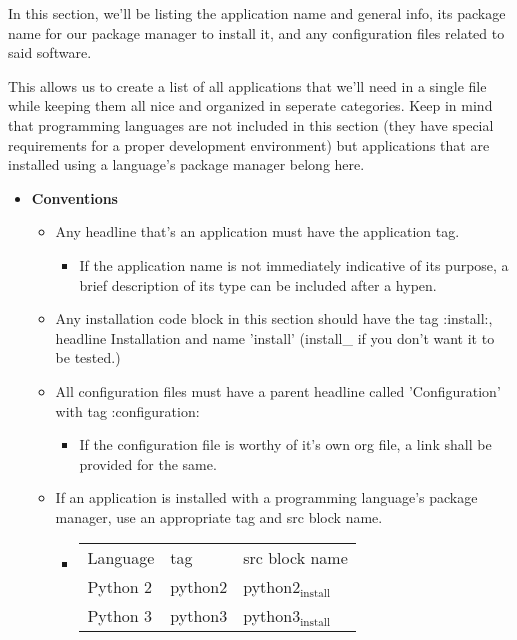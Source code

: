 \documentclass[11pt]{article}
\begin{document}
In this section, we'll be listing the application name and general info, its package name for our package manager to install it, and any configuration files related to said software.

This allows us to create a list of all applications that we'll need in a single file while keeping them all nice and organized in seperate categories. Keep in mind that programming languages are not included in this section (they have special requirements for a proper development environment) but applications that are installed using a language's package manager belong here.

\begin{itemize}
\item \textbf{Conventions}
\begin{itemize}
\item Any headline that's an application must have the application tag. 
\begin{itemize}
\item If the application name is not immediately indicative of its purpose, a brief description of its type can be included after a hypen.
\end{itemize}
\item Any installation code block in this section should have the tag :install:, headline Installation and name 'install' (install\_ if you don't want it to be tested.)
\item All configuration files must have a parent headline called 'Configuration' with tag :configuration:
\begin{itemize}
\item If the configuration file is worthy of it's own org file, a link shall be provided for the same.
\end{itemize}
\item If an application is installed with a programming language's package manager, use an appropriate tag and src block name.
\begin{itemize}
\item \begin{center}
\begin{tabular}{lll}
Language & tag & src block name\\
Python 2 & python2 & python2\(_{\text{install}}\)\\
Python 3 & python3 & python3\(_{\text{install}}\)\\
\end{tabular}
\end{center}
\end{itemize}
\end{itemize}
\end{itemize}
\end{document}
